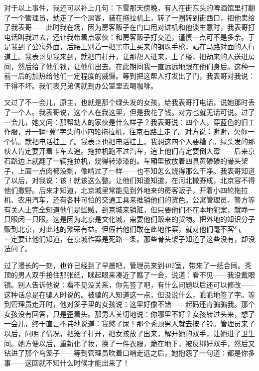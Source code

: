 对于以上事件，我还可以补上几句：下雪那天傍晚，有人在街东头的啤酒馆里打翻了一个管理员，劫走了一个房客，装在拖拉机上，转了一圈转到街西口，把他卖给了我表哥——此时我在场，因为房客贩子在门口用对讲机和他谈生意时，我表哥打电话叫我过去，还让我带着点家伙：和房客贩子打交道，谨慎一点可不是多余。于是我到了公寓外面，后腰上别着一把黑市上买来的钢珠手枪，站在马路对面的人行道上。我表哥见我来到，就把门打开，让那帮人进来，上了楼，把劫来的人送进房间，然后给了他们钱，让他们出去。在此期间我一直远远地跟在他们身后。这种一前一后的加热给他们一定程度的威慑。等到把这帮人打发出了门，我表哥对我说：干得不坏。我们表兄弟俩就到办公室里去喝咖啡。 

又过了不一会儿，原主，也就是那个绿头发的女孩，给我表哥打电话，说她那时丢了一个人。我表哥说，这个人在我这里，但是我花了钱。对方也就无话可说。过了一会儿，她又问：那帮劫人的家伙是什么样子？我表哥说：四个人，穿蓝色的旧工作服，开一辆“冀”字头的小四轮拖拉机，往京石路上走了。对方说：谢谢，欠你一个情。就把电话挂上了。我表哥也把电话挂上。我想这四个人要糟了。绿头发的那伙人肯定要开着卡车去追。拖拉机跑不过汽车，追上他们肯定要倒大霉——后来京石路边上就翻了一辆拖拉机，烧得转漆漆的。车厢里散放着四具黄碜碜的骨头架子，上面一点肉都没剩，像啃过了一样——也不知怎么烧得那么干净。我表哥知道了以后，对我说：该！就该这么整。让他们知道知道，在河北撒野成，北京容不得他们撒野。后来才知道，北京城里常能见到外地来的房客贩子，开着小四轮拖拉机、农用汽车，还有各种可怕的交通工具来推销他们的货色。公寓管理员、警方等有关人士完全知道他们是些贼，到京城来销赃，但只要他们不在本地犯案，就睁一只眼闭一只眼。这是因为北京是文化城，需要他们贩来的货物。把外地的知识分子贩到北京，对此地的繁荣有益。但假若他们敢在此地作案，就对他们毫不客气——一定要让他们知道，在京城作案是死路一条。那些骨头架子知道了这些没有，却没法问了。 



过了漫长的一刻，也许已经到了早晨吧，管理员来到402室，带来了一纸合同。秃顶的男人双手接住那张纸，眯起眼来凑近了瞧了一会，说道：看不见——我没戴眼镜。别人告诉他说：看不见没关系，你先签了吧，有什么问题以后还可以修改——这种话总是在骗人时说的。被骗的人知道这一点，但没说什么，乖乖地签了字。等到管理员走开时，他对笼子里的女孩说：这里好像不错——起码还肯骗骗我。那个女孩没有回答，只是歪着头。那男人关切地说：你哪里不好？女孩转过头来，想了一会儿，终于直言不讳地说道：我憋了尿！那个秃顶男人就去按了铃。管理员来了以后，问明了情况，把笼子打开，把女孩放了出来，解开她的双手，让她进了卫生间。她方便以后，重新化了妆，换了一件衣服，跪在地下，被反绑好双手，然后又钻进了那个鸟笼子——等到管理员吹着口哨走远之后，她抱怨了一句道：都是你多事——这回就不知什么时候才能出来了！ 



